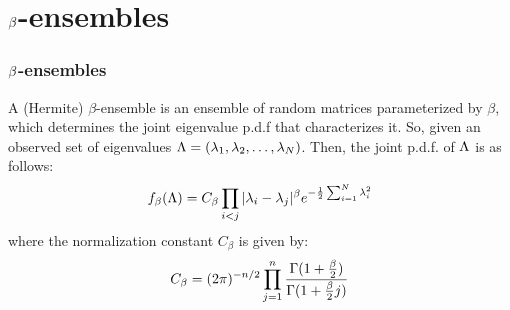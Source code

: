 

\section{$\b$-ensembles}

\begin{frame} \frametitle{$\b$-ensembles}

\begin{alertblock}{}
A (Hermite) $\beta$-ensemble is an ensemble of random matrices parameterized by $\beta$, which determines the joint eigenvalue p.d.f that characterizes it.
So, given an observed set of eigenvalues $\L = (\seqo[N]{\lambda})$. Then, the joint p.d.f. of $\L$ is as follows:
\begin{align*}
\jepdf = C_\beta \prod_{i < j} |\lambda_i - \lambda_j|^\beta e^{-\frac{1}{2} \sum_{i=1}^N \lambda_i^2}
\end{align*}
where the normalization constant $C_\beta$ is given by:
\begin{align*}
C_{\beta} = (2\pi)^{-n/2} \prod_{j = 1}^n \frac{\Gamma(1 + \frac{\b}{2})}{\Gamma(1 + \frac{\b}{2}j)}
\end{align*}
\end{alertblock}

\end{frame}





